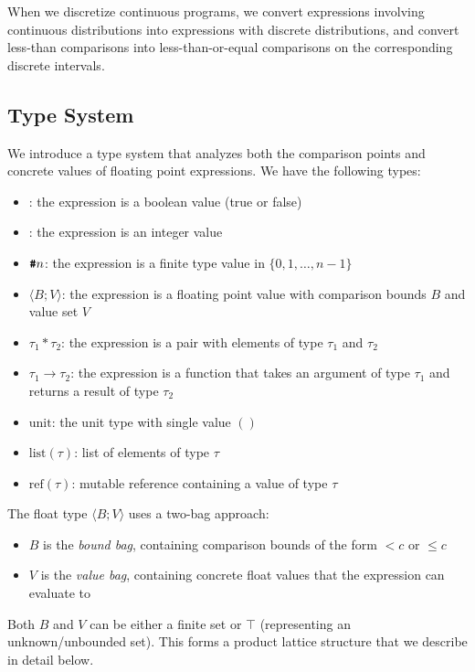 When we discretize continuous programs, we convert expressions involving continuous distributions into expressions with discrete distributions, and convert less-than comparisons into less-than-or-equal comparisons on the corresponding discrete intervals.

\subsection{Type System}\label{sec:type-system}

We introduce a type system that analyzes both the comparison points and concrete values of floating point expressions. We have the following types:
\begin{itemize}
    \item \bool: the expression is a boolean value (true or false)
    \item \intty: the expression is an integer value  
    \item $\text{\ttfamily\bfseries \#}n$: the expression is a finite type value in $\{0, 1, \ldots, n-1\}$
    \item \float$\langle B; V \rangle$: the expression is a floating point value with comparison bounds $B$ and value set $V$
    \item $\tau_1 * \tau_2$: the expression is a pair with elements of type $\tau_1$ and $\tau_2$
    \item $\tau_1 \rightarrow \tau_2$: the expression is a function that takes an argument of type $\tau_1$ and returns a result of type $\tau_2$
    \item $\text{unit}$: the unit type with single value $()$
    \item $\text{list}(\tau)$: list of elements of type $\tau$
    \item $\text{ref}(\tau)$: mutable reference containing a value of type $\tau$
\end{itemize}

The float type \float$\langle B; V \rangle$ uses a two-bag approach:
\begin{itemize}
    \item $B$ is the \emph{bound bag}, containing comparison bounds of the form $< c$ or $\leq c$
    \item $V$ is the \emph{value bag}, containing concrete float values that the expression can evaluate to
\end{itemize}

Both $B$ and $V$ can be either a finite set or $\top$ (representing an unknown/unbounded set). This forms a product lattice structure that we describe in detail below.

